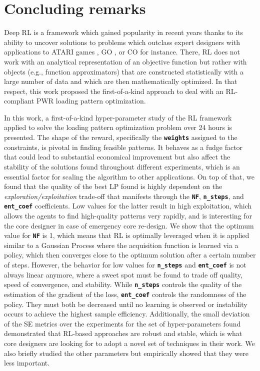 \documentclass[a4paper]{article}
\newcommand{\code}[1]{\colorbox{light-gray}{\small\color{blue}\textbf{\texttt{#1}}}}
\begin{document}
\section{Concluding remarks}
\label{sec:conclusion}
Deep RL is a framework which gained popularity in recent years thanks to its ability to uncover solutions to problems which outclass expert designers \cite{bengio2018machine} with applications to ATARI games \cite{mnih2015human}, GO \cite{silver2017mastering}, or CO \cite{mazyavkina2021reinforcement} for instance. There, RL does not work with an analytical representation of an objective function but rather with objects (e.g., function approximators) that are constructed statistically with a large number of data and which are then mathematically optimized. In that respect, this work proposed the first-of-a-kind approach to deal with an RL-compliant PWR loading pattern optimization.
 
 In this work, a first-of-a-kind hyper-parameter study of the RL framework applied to solve the loading pattern optimization problem over 24 hours is presented.  The shape of the reward, specifically the \code{weights} assigned to the constraints, is pivotal in finding feasible patterns. It behaves as a fudge factor that could lead to substantial economical improvement but also affect the stability of the solutions found throughout different experiments, which is an essential factor for scaling the algorithm to other applications. On top of that, we found that the quality of the best LP found is highly dependent on the \textit{exploration/exploitation} trade-off that manifests through the \code{NF}, \code{n\_steps}, and \code{ent\_coef} coefficients. Low values for the latter result in high exploitation, which allows the agents to find high-quality patterns very rapidly, and is interesting for the core designer in case of emergency core re-design. We show that the optimum value for \code{NF} is 1, which means that RL is optimally leveraged when it is applied similar to a Gaussian Process where the acquisition function is learned via a policy, which then converges close to the optimum solution after a certain number of steps. However, the behavior for low values for \code{n\_steps} and \code{ent\_coef} is not always linear anymore, where a sweet spot must be found to trade off quality, speed of convergence, and stability. While \code{n\_steps} controls the quality of the estimation of the gradient of the loss, \code{ent\_coef} controls the randomness of the policy. They must both be decreased until no learning is observed or instability occurs to achieve the highest sample efficiency. Additionally, the small deviation of the SE metrics over the experiments for the set of hyper-parameters found demonstrated that RL-based approaches are robust and stable, which is what core designers are looking for to adopt a novel set of techniques in their work. We also briefly studied the other parameters but empirically showed that they were less important. 
 
\end{document}
